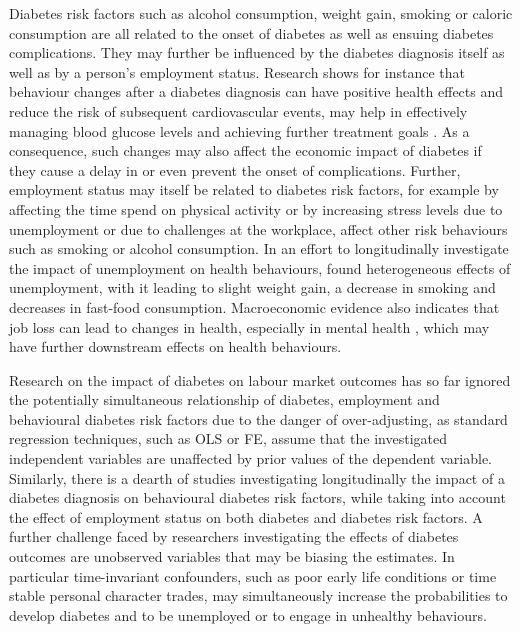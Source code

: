 Diabetes risk factors such as alcohol consumption, weight gain, smoking or caloric consumption are all related to the onset of diabetes as well as ensuing diabetes complications. They may further be influenced by the diabetes diagnosis itself as well as by a person's employment status. Research shows for instance that behaviour changes after a diabetes diagnosis can have positive health effects and reduce the risk of subsequent cardiovascular events\parencite{Long2014}, may help in effectively managing blood glucose levels and achieving further treatment goals \parencite{Zhou2016}. As a consequence, such changes may also affect the economic impact of diabetes if they cause a delay in or even prevent the onset of complications. Further, employment status may itself be related to diabetes risk factors, for example by affecting the time spend on physical activity or by increasing stress levels due to unemployment or due to challenges at the workplace, affect other risk behaviours such as smoking or alcohol consumption. In an effort to longitudinally investigate the impact of unemployment on health behaviours, \textcite{Colman2014} found heterogeneous effects of unemployment, with it leading to slight weight gain, a decrease in smoking and decreases in fast-food consumption. Macroeconomic evidence also indicates that job loss can lead to changes in health, especially in mental health \parencite{Charles2008}, which may have further downstream effects on health behaviours.

Research on the impact of diabetes on labour market outcomes has so far ignored the potentially simultaneous relationship of diabetes, employment and behavioural diabetes risk factors due to the danger of over-adjusting, as standard regression techniques, such as \ac{OLS} or \ac{FE}, assume that the investigated independent variables are unaffected by prior values of the dependent variable. Similarly, there is a dearth of studies investigating longitudinally the impact of a diabetes diagnosis on behavioural diabetes risk factors, while taking into account the effect of employment status on both diabetes and diabetes risk factors. A further challenge faced by researchers investigating the effects of diabetes outcomes are unobserved variables that may be biasing the estimates. In particular time-invariant confounders, such as poor early life conditions or time stable personal character trades, may simultaneously increase the probabilities to develop diabetes and to be unemployed or to engage in unhealthy behaviours. 

